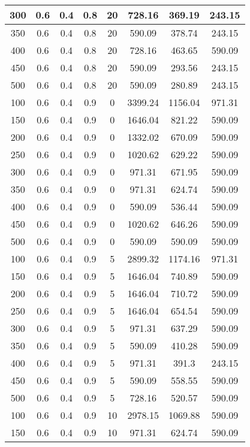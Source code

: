 \documentclass[a4paper, 12pt]{extreport}
\begin{document}
\begin{itemize}
\begin{longtable}{|c|c|c|c|c|c|c|c|}
			300 & 0.6 & 0.4 & 0.8 & 20 & 728.16 & 369.19 & 243.15 \\\hline
			350 & 0.6 & 0.4 & 0.8 & 20 & 590.09 & 378.74 & 243.15 \\\hline
			400 & 0.6 & 0.4 & 0.8 & 20 & 728.16 & 463.65 & 590.09 \\\hline
			450 & 0.6 & 0.4 & 0.8 & 20 & 590.09 & 293.56 & 243.15 \\\hline
			500 & 0.6 & 0.4 & 0.8 & 20 & 590.09 & 280.89 & 243.15 \\\hline
			100 & 0.6 & 0.4 & 0.9 & 0 & 3399.24 & 1156.04 & 971.31 \\\hline
			150 & 0.6 & 0.4 & 0.9 & 0 & 1646.04 & 821.22 & 590.09 \\\hline
			200 & 0.6 & 0.4 & 0.9 & 0 & 1332.02 & 670.09 & 590.09 \\\hline
			250 & 0.6 & 0.4 & 0.9 & 0 & 1020.62 & 629.22 & 590.09 \\\hline
			300 & 0.6 & 0.4 & 0.9 & 0 & 971.31 & 671.95 & 590.09 \\\hline
			350 & 0.6 & 0.4 & 0.9 & 0 & 971.31 & 624.74 & 590.09 \\\hline
			400 & 0.6 & 0.4 & 0.9 & 0 & 590.09 & 536.44 & 590.09 \\\hline
			450 & 0.6 & 0.4 & 0.9 & 0 & 1020.62 & 646.26 & 590.09 \\\hline
			500 & 0.6 & 0.4 & 0.9 & 0 & 590.09 & 590.09 & 590.09 \\\hline
			100 & 0.6 & 0.4 & 0.9 & 5 & 2899.32 & 1174.16 & 971.31 \\\hline
			150 & 0.6 & 0.4 & 0.9 & 5 & 1646.04 & 740.89 & 590.09 \\\hline
			200 & 0.6 & 0.4 & 0.9 & 5 & 1646.04 & 710.72 & 590.09 \\\hline
			250 & 0.6 & 0.4 & 0.9 & 5 & 1646.04 & 654.54 & 590.09 \\\hline
			300 & 0.6 & 0.4 & 0.9 & 5 & 971.31 & 637.29 & 590.09 \\\hline
			350 & 0.6 & 0.4 & 0.9 & 5 & 590.09 & 410.28 & 590.09 \\\hline
			400 & 0.6 & 0.4 & 0.9 & 5 & 971.31 & 391.3 & 243.15 \\\hline
			450 & 0.6 & 0.4 & 0.9 & 5 & 590.09 & 558.55 & 590.09 \\\hline
			500 & 0.6 & 0.4 & 0.9 & 5 & 728.16 & 520.57 & 590.09 \\\hline
			100 & 0.6 & 0.4 & 0.9 & 10 & 2978.15 & 1069.88 & 590.09 \\\hline
			150 & 0.6 & 0.4 & 0.9 & 10 & 971.31 & 624.74 & 590.09 \\\hline

\end{longtable}
\end{itemize}
\end{document}
